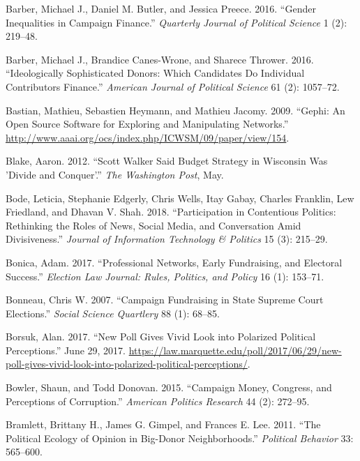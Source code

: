 \documentclass[12pt,]{article}
\begin{document}
\leavevmode\hypertarget{ref-barber2016b}{}%
Barber, Michael J., Daniel M. Butler, and Jessica Preece. 2016. ``Gender
Inequalities in Campaign Finance.'' \emph{Quarterly Journal of Political
Science} 1 (2): 219--48.

\leavevmode\hypertarget{ref-barber2016c}{}%
Barber, Michael J., Brandice Canes-Wrone, and Sharece Thrower. 2016.
``Ideologically Sophisticated Donors: Which Candidates Do Individual
Contributors Finance.'' \emph{American Journal of Political Science} 61
(2): 1057--72.

\leavevmode\hypertarget{ref-gephi}{}%
Bastian, Mathieu, Sebastien Heymann, and Mathieu Jacomy. 2009. ``Gephi:
An Open Source Software for Exploring and Manipulating Networks.''
\url{http://www.aaai.org/ocs/index.php/ICWSM/09/paper/view/154}.

\leavevmode\hypertarget{ref-blake2012}{}%
Blake, Aaron. 2012. ``Scott Walker Said Budget Strategy in Wisconsin Was
'Divide and Conquer'.'' \emph{The Washington Post}, May.

\leavevmode\hypertarget{ref-bode2018}{}%
Bode, Leticia, Stephanie Edgerly, Chris Wells, Itay Gabay, Charles
Franklin, Lew Friedland, and Dhavan V. Shah. 2018. ``Participation in
Contentious Politics: Rethinking the Roles of News, Social Media, and
Conversation Amid Divisiveness.'' \emph{Journal of Information
Technology \& Politics} 15 (3): 215--29.

\leavevmode\hypertarget{ref-bonica2017}{}%
Bonica, Adam. 2017. ``Professional Networks, Early Fundraising, and
Electoral Success.'' \emph{Election Law Journal: Rules, Politics, and
Policy} 16 (1): 153--71.

\leavevmode\hypertarget{ref-bonneau2007}{}%
Bonneau, Chris W. 2007. ``Campaign Fundraising in State Supreme Court
Elections.'' \emph{Social Science Quartlery} 88 (1): 68--85.

\leavevmode\hypertarget{ref-borsuk2017}{}%
Borsuk, Alan. 2017. ``New Poll Gives Vivid Look into Polarized Political
Perceptions.'' June 29, 2017.
\url{https://law.marquette.edu/poll/2017/06/29/new-poll-gives-vivid-look-into-polarized-political-perceptions/}.

\leavevmode\hypertarget{ref-bowler2015}{}%
Bowler, Shaun, and Todd Donovan. 2015. ``Campaign Money, Congress, and
Perceptions of Corruption.'' \emph{American Politics Research} 44 (2):
272--95.

\leavevmode\hypertarget{ref-bramlett2011}{}%
Bramlett, Brittany H., James G. Gimpel, and Frances E. Lee. 2011. ``The
Political Ecology of Opinion in Big-Donor Neighborhoods.''
\emph{Political Behavior} 33: 565--600.
\end{document}
